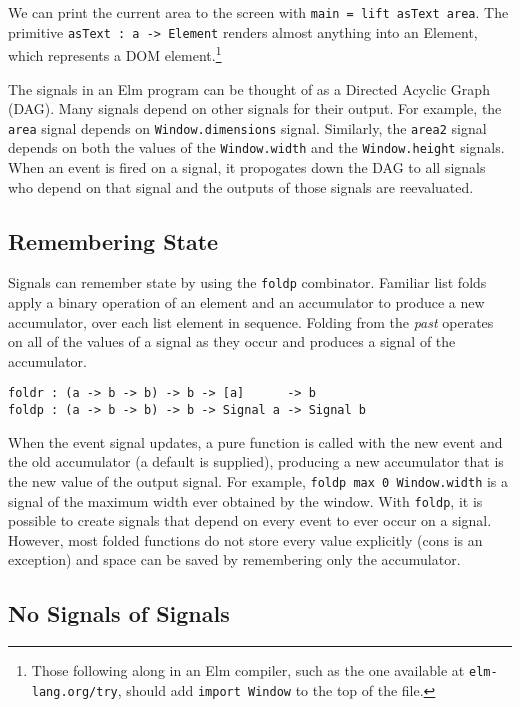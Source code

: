 \documentclass{article}
\begin{document}
We can print the current area to the screen with \texttt{main = lift asText
area}. The primitive \texttt{asText : a -\textgreater{} Element} renders almost
anything into an Element, which represents a DOM element.\footnote{Those
    following along in an Elm compiler, such as the one available at
    \texttt{elm-lang.org/try}, should add \texttt{import Window} to the top of
the file.}

The signals in an Elm program can be thought of as a Directed Acyclic
Graph (DAG). Many signals depend on other signals for their output. For
example, the \texttt{area} signal depends on \texttt{Window.dimensions}
signal. Similarly, the \texttt{area2} signal depends on both the values
of the \texttt{Window.width} and the \texttt{Window.height} signals.
When an event is fired on a signal, it propogates down the DAG to all
signals who depend on that signal and the outputs of those signals are
reevaluated.

\subsection{Remembering State}\label{remembering-state}

Signals can remember state by using the \texttt{foldp} combinator.
Familiar list folds apply a binary operation of an element and an
accumulator to produce a new accumulator, over each list element in
sequence. Folding from the \emph{past} operates on all of the values of
a signal as they occur and produces a signal of the accumulator.

\begin{verbatim}
foldr : (a -> b -> b) -> b -> [a]      -> b
foldp : (a -> b -> b) -> b -> Signal a -> Signal b
\end{verbatim}

When the event signal updates, a pure function is called with the new
event and the old accumulator (a default is supplied), producing a new
accumulator that is the new value of the output signal. For example,
\texttt{foldp max 0 Window.width} is a signal of the maximum width ever
obtained by the window. With \texttt{foldp}, it is possible to create
signals that depend on every event to ever occur on a signal. However,
most folded functions do not store every value explicitly (cons is an
exception) and space can be saved by remembering only the accumulator.

\subsection{No Signals of Signals}\label{no-signals-of-signals}
\end{document}
